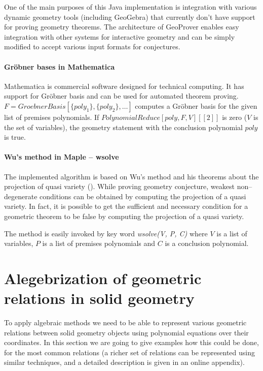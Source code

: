 \documentclass[final,1p,times,authoryear]{elsarticle}
\begin{document}
One of the main purposes of this Java implementation is integration
with various dynamic geometry tools (including GeoGebra) that
currently don't have support for proving geometry theorems. The
architecture of GeoProver enables easy integration with other systems
for interactive geometry and can be simply modified to accept various
input formats for conjectures.

\paragraph{Gr\"obner bases in Mathematica}

Mathematica is commercial software designed for technical
computing. It has support for Gr\"obner basis and can be used for
automated theorem proving.
$F = GroebnerBasis[\{poly_1\}, \{poly_2\}, \ldots]$ computes a
Gr\"obner basis for the given list of premises polynomials. If
$PolynomialReduce[poly, F, V][[2]]$ is zero ($V$ is the set of
variables), the geometry statement with the conclusion polynomial
$poly$ is true.

\paragraph{Wu's method in Maple -- wsolve}

The implemented algorithm is based on Wu's method and his theorems
about the projection of quasi variety (\cite{quasivarieties}). While
proving geometry conjecture, weakest non--degenerate conditions can be
obtained by computing the projection of a quasi variety. In fact, it
is possible to get the sufficient and necessary condition for a
geometric theorem to be false by computing the projection of a quasi
variety.

The method is easily invoked by key word \emph{wsolve(V, P, C)} where
$V$ is a list of variables, $P$ is a list of premises polynomials and
$C$ is a conclusion polynomial.

\section{Alegebrization of geometric relations in solid geometry}
\label{polynomials}
To apply algebraic methods we need to be able to represent various
geometric relations between solid geometry objects using polynomial
equations over their coordinates. In this section we are going to give
examples how this could be done, for the most common relations (a
richer set of relations can be represented using similar techniques,
and a detailed description is given in an online
appendix). 
\end{document}
